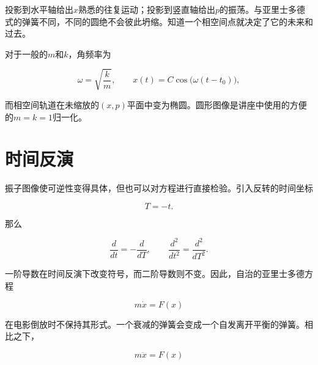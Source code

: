 投影到水平轴给出\(x\)熟悉的往复运动；投影到竖直轴给出\(p\)的振荡。与亚里士多德式的弹簧不同，不同的圆绝不会彼此坍缩。知道一个相空间点就决定了它的未来和过去。

对于一般的\(m\)和\(k\)，角频率为

\begin{equation}
  \omega=\sqrt{\frac{k}{m}},
  \qquad
  x(t)=C\cos\bigl(\omega(t-t_0)\bigr),
  \label{eq:general-oscillator-frequency}
\end{equation}

而相空间轨道在未缩放的\((x,p)\)平面中变为椭圆。圆形图像是讲座中使用的方便的\(m=k=1\)归一化。

\begin{classroomqa}
\end{classroomqa}

\section{时间反演}

振子图像使可逆性变得具体，但也可以对方程进行直接检验。引入反转的时间坐标

\begin{equation}
  T=-t.
  \label{eq:reverse-time}
\end{equation}

那么

\begin{equation}
  \frac{d}{dt}=-\frac{d}{dT},
  \qquad
  \frac{d^2}{dt^2}=\frac{d^2}{dT^2}.
  \label{eq:time-derivative-parity}
\end{equation}

一阶导数在时间反演下改变符号，而二阶导数则不变。因此，自治的亚里士多德方程

\begin{equation}
  m\dot x=F(x)
  \label{eq:aristotle-time-reversal}
\end{equation}

在电影倒放时不保持其形式。一个衰减的弹簧会变成一个自发离开平衡的弹簧。相比之下，

\begin{equation}
  m\ddot x=F(x)
  \label{eq:newton-time-reversal}
\end{equation}

